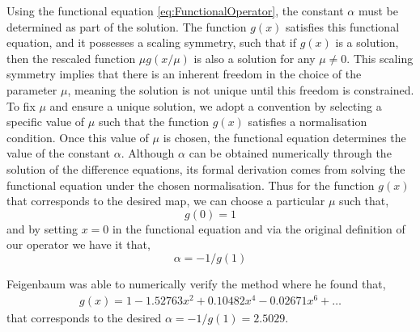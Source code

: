 Using the functional equation \eqref{eq:FunctionalOperator}, the constant $\alpha$ must be determined as part of the solution. The function $g(x)$ satisfies this functional equation, and it possesses a scaling symmetry, such that if $g(x)$ is a solution, then the rescaled function $\mu g(x/\mu)$ is also a solution for any $\mu \neq 0$. This scaling symmetry implies that there is an inherent freedom in the choice of the parameter $\mu$, meaning the solution is not unique until this freedom is constrained. To fix $\mu$ and ensure a unique solution, we adopt a convention by selecting a specific value of $\mu$ such that the function $g(x)$ satisfies a normalisation condition. Once this value of $\mu$ is chosen, the functional equation determines the value of the constant $\alpha$. Although $\alpha$ can be obtained numerically through the solution of the difference equations, its formal derivation comes from solving the functional equation under the chosen normalisation. Thus for the function $g(x)$ that corresponds to the desired map, we can choose a particular $\mu$ such that,
$$
g(0)=1
$$
and by setting $x=0$ in the functional equation and via the original definition of our operator we have it that,
$$
\alpha = -1/g(1)
$$

Feigenbaum was able to numerically verify the method where he found that,
\begin{align}
    g(x)= 1 - 1.52763x^2 + 0.10482x^4- 0.02671x^6 + \dots \label{eq:feigenbaum}
\end{align}
that corresponds to the desired $\alpha =-1/g(1)=2.5029$.

